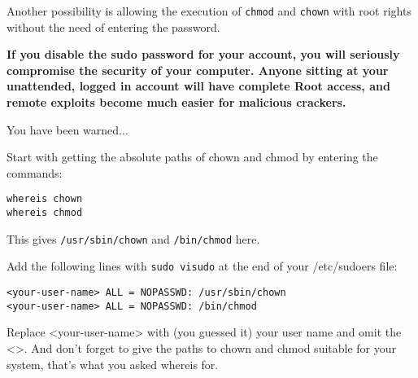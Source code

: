 Another  possibility is allowing the execution of \texttt{chmod}
and \texttt{chown} with root rights without the need of entering
the password. 

\textbf{If you disable the sudo password for your account, you 
will seriously compromise the security of your computer. Anyone sitting 
at your unattended, logged in account will have complete Root access, 
and remote exploits become much easier for malicious crackers.}

You have been warned...

Start with getting the absolute paths of chown and chmod by entering
the commands:

\begin{verbatim}
whereis chown
whereis chmod
\end{verbatim}

This gives \texttt{/usr/sbin/chown} and \texttt{/bin/chmod} here.

Add the following lines with \texttt{sudo visudo} at the end
of your /etc/sudoers file:

\begin{verbatim}
<your-user-name> ALL = NOPASSWD: /usr/sbin/chown
<your-user-name> ALL = NOPASSWD: /bin/chmod
\end{verbatim}

Replace <your-user-name> with (you guessed it) your user name and
omit the <>. And don't forget to give the paths to chown and chmod
suitable for your system, that's what you asked whereis for.



